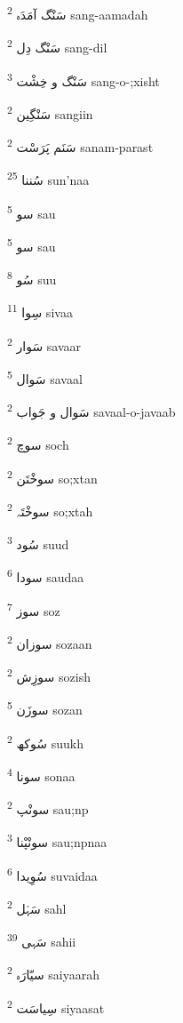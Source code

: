 \documentclass[12pt]{article}
\begin{document}
\begin{RTL}
\begin{multicols}{5}
{\ur سَنْگ آمَدَہ}   \textsuperscript{2} sang-aamadah

{\ur سَنْگ دِل}   \textsuperscript{2} sang-dil

{\ur سَنْگ و خِشْت}   \textsuperscript{3} sang-o-;xisht

{\ur سَنْگِین}   \textsuperscript{2} sangiin

{\ur سَنَم پَرَسْت}   \textsuperscript{2} sanam-parast

{\ur سُننا}   \textsuperscript{25} sun'naa

{\ur سو}   \textsuperscript{5} sau

{\ur سو}   \textsuperscript{5} sau

{\ur سُو}   \textsuperscript{8} suu

{\ur سِوا}   \textsuperscript{11} sivaa

{\ur سَوار}   \textsuperscript{2} savaar

{\ur سَوال}   \textsuperscript{5} savaal

{\ur سَوال و جَواب}   \textsuperscript{2} savaal-o-javaab

{\ur سوچ}   \textsuperscript{2} soch

{\ur سوخْتَن}   \textsuperscript{2} so;xtan

{\ur سوخْتَہ}   \textsuperscript{2} so;xtah

{\ur سُود}   \textsuperscript{3} suud

{\ur سودا}   \textsuperscript{6} saudaa

{\ur سوز}   \textsuperscript{7} soz

{\ur سوزان}   \textsuperscript{2} sozaan

{\ur سوزِش}   \textsuperscript{2} sozish

{\ur سوزَن}   \textsuperscript{5} sozan

{\ur سُوکھ}   \textsuperscript{2} suukh

{\ur سونا}   \textsuperscript{4} sonaa

{\ur سونْپ}   \textsuperscript{2} sau;np

{\ur سونْپْنا}   \textsuperscript{3} sau;npnaa

{\ur سُوِیدا}   \textsuperscript{6} suvaidaa

{\ur سَہْل}   \textsuperscript{2} sahl

{\ur سَہی}   \textsuperscript{39} sahii

{\ur سیّارَہ}   \textsuperscript{2} saiyaarah

{\ur سِیاسَت}   \textsuperscript{2} siyaasat


\end{multicols}
\end{RTL}
\end{document}
